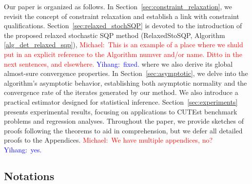 \documentclass[aos]{imsart}
\numberwithin{equation}{section}
\theoremstyle{plain}
\newcommand{\michael}[1]{\textcolor{red}{Michael:\ #1}}
\newcommand{\yihang}[1]{\textcolor{blue}{Yihang:\ #1}}
\begin{document}
Our paper is organized as follows. 
In Section~\ref{sec:constraint_relaxation}, we revisit the concept of constraint relaxation and establish a link with constraint qualifications. 
Section~\ref{sec:relaxed_stochSQP} is devoted to the introduction of the proposed relaxed stochastic SQP method (RelaxedStoSQP, Algorithm \ref{alg_det_relaxed_sqp}), 
\michael{This is an example of a place where we shuld put in an explicit reference to the Algorithm numver and/or name. Ditto in the next sentences, and elsewhere.} \yihang{fixed.}
where we also derive its global almost-sure convergence properties. 
In Section~\ref{sec:asymptotic}, we delve into the algorithm's asymptotic behavior, establishing both asymptotic normality and the convergence rate of the iterates generated by our method. 
We also introduce a practical estimator designed for statistical inference. 
Section~\ref{sec:experiments} presents experimental results, focusing on applications to CUTEst benchmark problems and regression analyses. 
Throughout the paper, we provide sketches of proofs following the theorems to aid in comprehension, but we defer all detailed proofs to the Appendices.
\michael{We have multiple appendices, no?} \yihang{yes.}


\subsection{Notations} 
\end{document}
